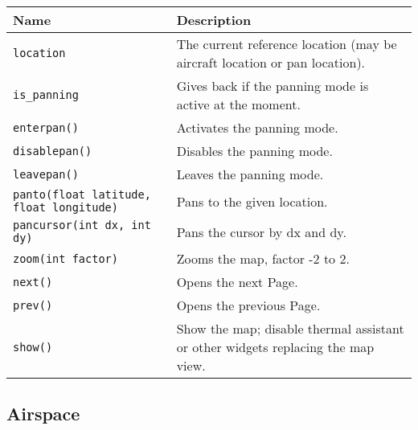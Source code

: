 \begin{maxipage}
\begin{tabularx}{1.9\textwidth}{l|X}
Name & Description \\
\hline\hline

\verb|location| & The current reference location (may be aircraft location or
pan location). \\

\hline

\verb|is_panning| & Gives back if the panning mode is active at the moment.\\

\hline

\verb|enterpan()| & Activates the panning mode.\\

\hline

\verb|disablepan()| & Disables the panning mode.\\

\hline

\verb|leavepan()| & Leaves the panning mode.\\

\hline

\verb|panto(float latitude, float longitude)| & Pans to the given location.\\

\hline

\verb|pancursor(int dx, int dy)| & Pans the cursor by dx and dy. \\

\hline

\verb|zoom(int factor)| & Zooms the map, factor -2 to 2.\\

\hline

\verb|next()| & Opens the next Page.\\

\hline

\verb|prev()| & Opens the previous Page.\\

\hline

\verb|show()| & Show the map; disable thermal assistant or other
widgets replacing the map view. \\

\end{tabularx}
\end{maxipage}

\subsection{Airspace}

